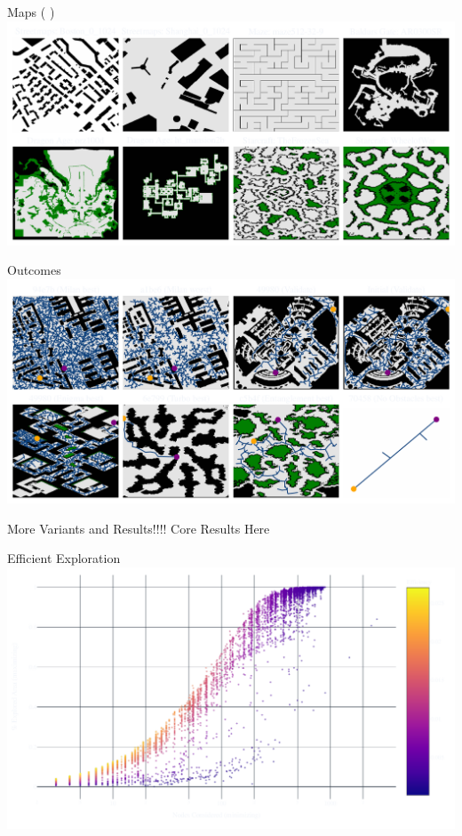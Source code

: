 \documentclass[aspectratio=169]{beamer}
\begin{document}
\begin{frame}{Maps {\Medium \color{white}( \cite{sturtevant2012benchmarks})}}
    \includegraphics[width=1.0\linewidth, keepaspectratio]{figures/show_maps.pdf}
\end{frame}

\begin{frame}{Outcomes}
    \includegraphics[width=1.0\linewidth, keepaspectratio]{figures/learned.pdf}
\end{frame}

\begin{frame}{More Variants and Results!!!!}
    \centering
    \vfill
    {\fontsize{40}{50}\selectfont Core Results Here}
    \vfill
\end{frame}

\begin{frame}{Efficient Exploration}
    \centering
    \includegraphics[width=0.85\linewidth, keepaspectratio]{figures/efficient_overview.pdf}
\end{frame}
\end{document}
